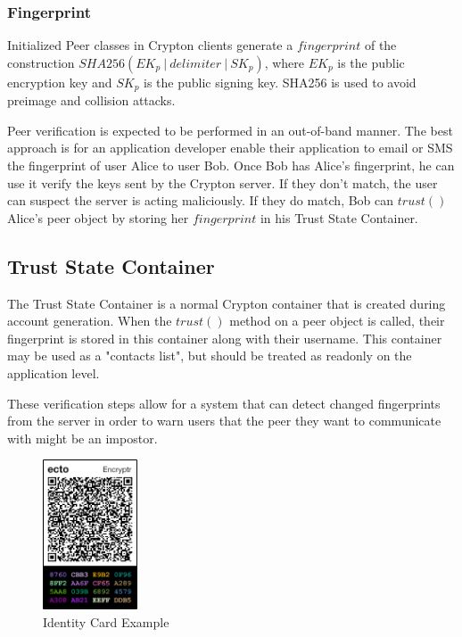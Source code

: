 \documentclass[conference]{IEEEtran}
\begin{document}
\subsubsection{Fingerprint}
Initialized Peer classes in Crypton clients generate a \(fingerprint\) of the
construction \(SHA256(EK_p\ |\ delimiter\ |\ SK_p)\), where \(EK_p\) is the
public encryption key and \(SK_p\) is the public signing key. SHA256 is used to
avoid preimage and collision attacks.

Peer verification is expected to be performed in an out-of-band manner.
The best approach is for an application developer enable their application
to email or SMS the fingerprint of user Alice to user Bob. Once Bob has Alice's 
fingerprint, he can use it verify the keys sent by the Crypton server. If they
don't match, the user can suspect the server is acting maliciously. If they
do match, Bob can \(trust()\) Alice's peer object by storing her \(fingerprint\)
in his Trust State Container.

\subsection{Trust State Container}
The Trust State Container is a normal Crypton container that is created
during account generation. When the \(trust()\) method on a peer object is called,
their fingerprint is stored in this container along with their username. This
container may be used as a "contacts list", but should be treated as readonly
on the application level.

These verification steps allow for a system that can detect changed fingerprints
from the server in order to warn users that the peer they want to communicate with
might be an impostor.

\begin{figure}[h]
  \centering
  \includegraphics[width=0.25\textwidth]{id-card-border.png}
  \caption{Identity Card Example}
\end{figure}
\end{document}
